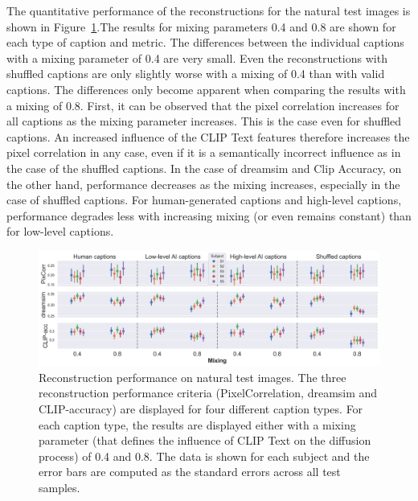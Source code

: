 The quantitative performance of the reconstructions for the natural test images is shown in Figure~\ref{fig:aicap_reconstruction_test_both_mixings}.The results for mixing parameters 0.4 and 0.8 are shown for each type of caption and metric. The differences between the individual captions with a mixing parameter of 0.4 are very small. Even the reconstructions with shuffled captions are only slightly worse with a mixing of 0.4 than with valid captions. The differences only become apparent when comparing the results with a mixing of 0.8. First, it can be observed that the pixel correlation increases for all captions as the mixing parameter increases. This is the case even for shuffled captions. An increased influence of the CLIP Text features therefore increases the pixel correlation in any case, even if it is a semantically incorrect influence as in the case of the shuffled captions. In the case of dreamsim and Clip Accuracy, on the other hand, performance decreases as the mixing increases, especially in the case of shuffled captions. For human-generated captions and high-level captions, performance degrades less with increasing mixing (or even remains constant) than for low-level captions. 
\begin{figure}[ht]
    \centering
    \includegraphics[width=1\textwidth]{plots/aicap_reconstruction_test_both_mixings.png}
    \caption[Experiment 2: Reconstruction performance on natural test images]{Reconstruction performance on natural test images. The three reconstruction performance criteria (PixelCorrelation, dreamsim and CLIP-accuracy) are displayed for four different caption types. For each caption type, the results are displayed either with a mixing parameter (that defines the influence of CLIP Text on the diffusion process) of 0.4 and 0.8. The data is shown for each subject and the error bars are computed as the standard errors across all test samples.}\label{fig:aicap_reconstruction_test_both_mixings}
\end{figure}


